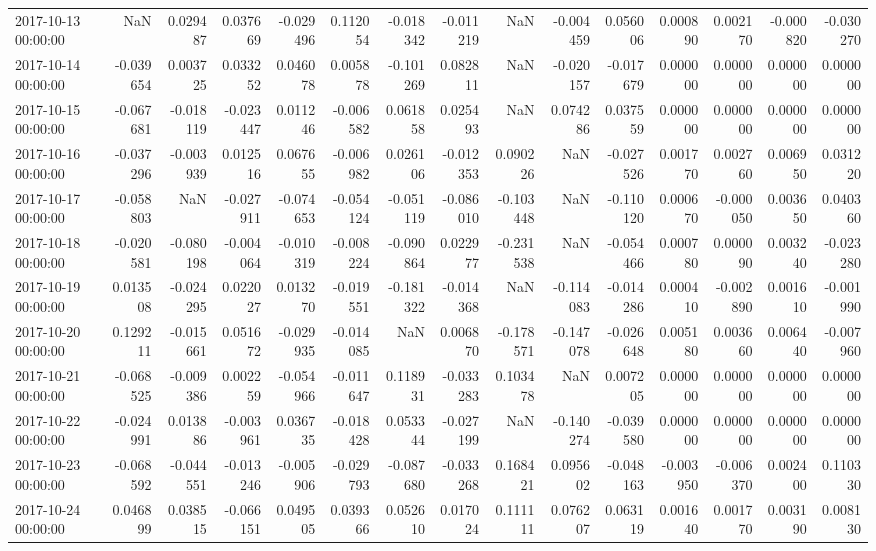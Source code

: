\begin{tabular}{lrrrrrrrrrrrrrr}
2017-10-13 00:00:00 & NaN & 0.029487 & 0.037669 & -0.029496 & 0.112054 & -0.018342 & -0.011219 & NaN & -0.004459 & 0.056006 & 0.000890 & 0.002170 & -0.000820 & -0.030270 \\
2017-10-14 00:00:00 & -0.039654 & 0.003725 & 0.033252 & 0.046078 & 0.005878 & -0.101269 & 0.082811 & NaN & -0.020157 & -0.017679 & 0.000000 & 0.000000 & 0.000000 & 0.000000 \\
2017-10-15 00:00:00 & -0.067681 & -0.018119 & -0.023447 & 0.011246 & -0.006582 & 0.061858 & 0.025493 & NaN & 0.074286 & 0.037559 & 0.000000 & 0.000000 & 0.000000 & 0.000000 \\
2017-10-16 00:00:00 & -0.037296 & -0.003939 & 0.012516 & 0.067655 & -0.006982 & 0.026106 & -0.012353 & 0.090226 & NaN & -0.027526 & 0.001770 & 0.002760 & 0.006950 & 0.031220 \\
2017-10-17 00:00:00 & -0.058803 & NaN & -0.027911 & -0.074653 & -0.054124 & -0.051119 & -0.086010 & -0.103448 & NaN & -0.110120 & 0.000670 & -0.000050 & 0.003650 & 0.040360 \\
2017-10-18 00:00:00 & -0.020581 & -0.080198 & -0.004064 & -0.010319 & -0.008224 & -0.090864 & 0.022977 & -0.231538 & NaN & -0.054466 & 0.000780 & 0.000090 & 0.003240 & -0.023280 \\
2017-10-19 00:00:00 & 0.013508 & -0.024295 & 0.022027 & 0.013270 & -0.019551 & -0.181322 & -0.014368 & NaN & -0.114083 & -0.014286 & 0.000410 & -0.002890 & 0.001610 & -0.001990 \\
2017-10-20 00:00:00 & 0.129211 & -0.015661 & 0.051672 & -0.029935 & -0.014085 & NaN & 0.006870 & -0.178571 & -0.147078 & -0.026648 & 0.005180 & 0.003660 & 0.006440 & -0.007960 \\
2017-10-21 00:00:00 & -0.068525 & -0.009386 & 0.002259 & -0.054966 & -0.011647 & 0.118931 & -0.033283 & 0.103478 & NaN & 0.007205 & 0.000000 & 0.000000 & 0.000000 & 0.000000 \\
2017-10-22 00:00:00 & -0.024991 & 0.013886 & -0.003961 & 0.036735 & -0.018428 & 0.053344 & -0.027199 & NaN & -0.140274 & -0.039580 & 0.000000 & 0.000000 & 0.000000 & 0.000000 \\
2017-10-23 00:00:00 & -0.068592 & -0.044551 & -0.013246 & -0.005906 & -0.029793 & -0.087680 & -0.033268 & 0.168421 & 0.095602 & -0.048163 & -0.003950 & -0.006370 & 0.002400 & 0.110330 \\
2017-10-24 00:00:00 & 0.046899 & 0.038515 & -0.066151 & 0.049505 & 0.039366 & 0.052610 & 0.017024 & 0.111111 & 0.076207 & 0.063119 & 0.001640 & 0.001770 & 0.003190 & 0.008130 \\

\end{tabular}

